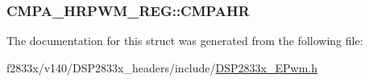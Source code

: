 \subsubsection[{C\+M\+P\+A\+H\+R}]{ C\+M\+P\+A\+\_\+\+H\+R\+P\+W\+M\+\_\+\+R\+E\+G\+::\+C\+M\+P\+A\+H\+R}\label{struct_c_m_p_a___h_r_p_w_m___r_e_g_ab0aabc0d6e9e25a559871667882df392}


The documentation for this struct was generated from the following file\+:\begin{DoxyCompactItemize}
\item 
f2833x/v140/\+D\+S\+P2833x\+\_\+headers/include/\hyperlink{_d_s_p2833x___e_pwm_8h}{D\+S\+P2833x\+\_\+\+E\+Pwm.\+h}\end{DoxyCompactItemize}
